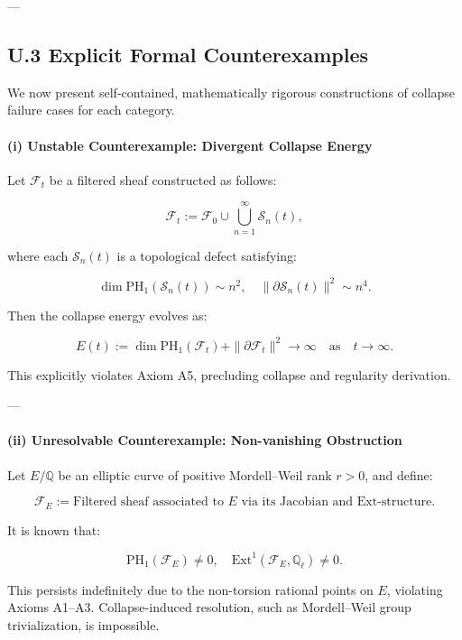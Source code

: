 \documentclass[11pt]{article}
\begin{document}
---

\subsection*{U.3 Explicit Formal Counterexamples}

We now present self-contained, mathematically rigorous constructions of collapse failure cases for each category.

\paragraph{(i) Unstable Counterexample: Divergent Collapse Energy}

Let $\mathcal{F}_t$ be a filtered sheaf constructed as follows:

\[
\mathcal{F}_t := \mathcal{F}_0 \cup \bigcup_{n=1}^\infty \mathcal{S}_n(t),
\]

where each $\mathcal{S}_n(t)$ is a topological defect satisfying:

\[
\dim \mathrm{PH}_1(\mathcal{S}_n(t)) \sim n^2, \quad \|\partial \mathcal{S}_n(t)\|^2 \sim n^4.
\]

Then the collapse energy evolves as:

\[
E(t) := \dim \mathrm{PH}_1(\mathcal{F}_t) + \|\partial \mathcal{F}_t\|^2 \longrightarrow \infty \quad \text{as} \quad t \to \infty.
\]

This explicitly violates Axiom A5, precluding collapse and regularity derivation.

---

\paragraph{(ii) Unresolvable Counterexample: Non-vanishing Obstruction}

Let $E/\mathbb{Q}$ be an elliptic curve of positive Mordell–Weil rank $r>0$, and define:

\[
\mathcal{F}_E := \text{Filtered sheaf associated to } E \text{ via its Jacobian and Ext-structure}.
\]

It is known that:

\[
\mathrm{PH}_1(\mathcal{F}_E) \neq 0, \quad \mathrm{Ext}^1(\mathcal{F}_E, \mathbb{Q}_\ell) \neq 0.
\]

This persists indefinitely due to the non-torsion rational points on $E$, violating Axioms A1–A3.  
Collapse-induced resolution, such as Mordell–Weil group trivialization, is impossible.
\end{document}
